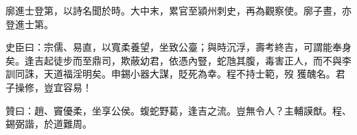 \begin{pinyinscope}
 廓進士登第，以詩名聞於時。大中末，累官至潁州刺史，再為觀察使。廓子晝，亦登進士第。



 史臣曰：宗儒、易直，以寬柔養望，坐致公臺；與時沉浮，壽考終吉，可謂能奉身矣。逢吉起徒步而至鼎司，欺蔽幼君，依憑內豎，蛇虺其腹，毒害正人，而不與李訓同誅，天道福淫明矣。申錫小器大謀，貶死為幸。程不持士範，歿
 獲醜名。君子操修，豈宜容易！



 贊曰：趙、竇優柔，坐享公侯。蝮蛇野葛，逢吉之流。豈無令人？主輔謨猷。程、錫弼諧，於道難周。



\end{pinyinscope}